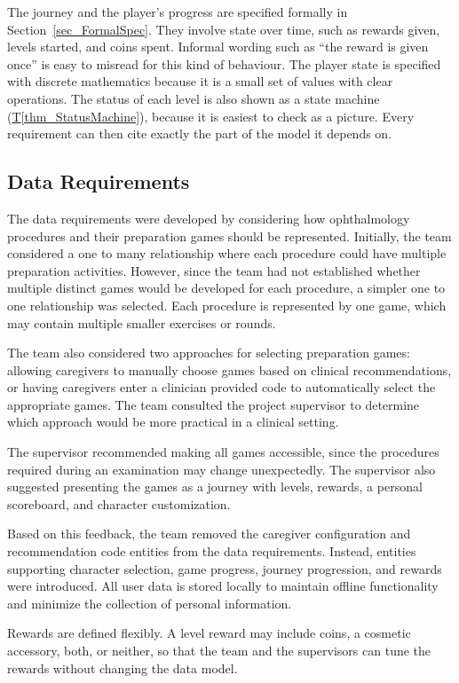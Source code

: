 \documentclass[12pt]{article}
\newcommand{\thmref}[1]{\hyperref[#1]{T\ref*{#1}}}
\begin{document}
The journey and the player's progress are specified formally in
Section~\ref{sec_FormalSpec}. They involve state over time, such as rewards
given, levels started, and coins spent. Informal wording such as ``the reward
is given once'' is easy to misread for this kind of behaviour. The player
state is specified with discrete mathematics because it is a small set of
values with clear operations. The status of each level is also shown as a
state machine (\thmref{thm_StatusMachine}), because it is easiest to check as
a picture. Every requirement can then cite exactly the part of the model it
depends on.

\subsection{Data Requirements}

The data requirements were developed by considering how
ophthalmology procedures and their preparation games should
be represented. Initially, the team considered a one to many
relationship where each procedure could have multiple
preparation activities. However, since the team had not established
whether multiple distinct games would be developed for
each procedure, a simpler one to one relationship was selected.
Each procedure is represented by one game, which may contain
multiple smaller exercises or rounds.

The team also considered two approaches for selecting preparation
games: allowing caregivers to manually choose games based
on clinical recommendations, or having caregivers enter a
clinician provided code to automatically select the appropriate
games. The team consulted the project supervisor to determine
which approach would be more practical in a clinical setting.

The supervisor recommended making all games accessible,
since the procedures required during an examination may
change unexpectedly. The supervisor also suggested presenting the
games as a journey with levels, rewards, a personal
scoreboard, and character customization.

Based on this feedback, the team removed the caregiver configuration
and recommendation code entities from the data requirements.
Instead, entities supporting character selection, 
game progress, journey progression, and rewards
were introduced. All user data is stored locally to maintain
offline functionality and minimize the collection of
personal information.

Rewards are defined flexibly. A level reward may include coins, a
cosmetic accessory, both, or neither, so that the team and the
supervisors can tune the rewards without changing the data model.
\end{document}
